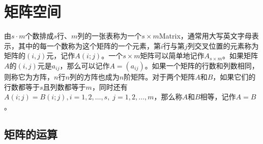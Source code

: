 \section{矩阵空间}

\begin{definition}
	由$s\cdot m$个数排成$s$行、$m$列的一张表称为一个$s\times m$\gls{Matrix}，通常用大写英文字母表示，其中的每一个数称为这个矩阵的一个元素，第$i$行与第$j$列交叉位置的元素称为矩阵的$(i,j)$元，记作$A(i;j)$。一个$s\times m$矩阵可以简单地记作$A_{s\times m}$。如果矩阵$A$的$(i,j)$元是$a_{ij}$，那么可以记作$A=(a_{ij})$。如果一个矩阵的行数和列数相同，则称它为方阵，$n$行$n$列的方阵也成为$n$阶矩阵。对于两个矩阵$A$和$B$，如果它们的行数都等于$s$且列数都等于$m$，同时还有$A(i;j)=B(i;j),i=1,2,\dots,s,\;j=1,2,\dots,m$，那么称$A$和$B$相等，记作$A=B$。
\end{definition}

\subsection{矩阵的运算}
